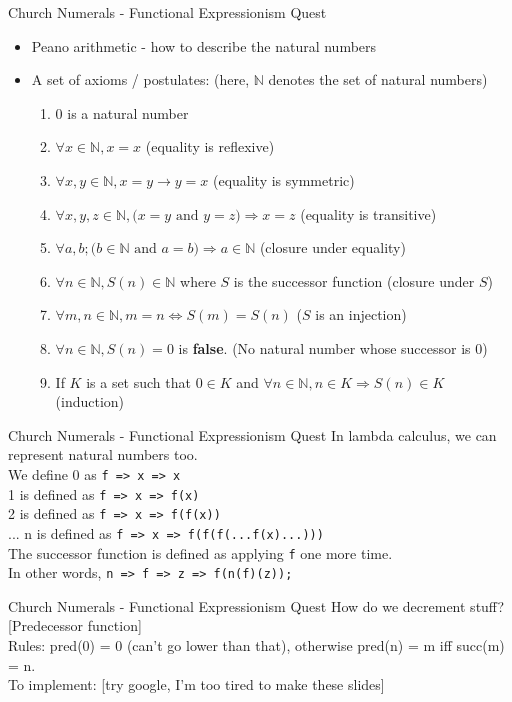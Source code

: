 \documentclass[10pt]{beamer}
\begin{document}
\begin{frame}[fragile]{Church Numerals - Functional Expressionism Quest}
\begin{itemize}
\item Peano arithmetic - how to describe the natural numbers
\item A set of axioms / postulates: (here, $\mathbb{N}$ denotes the set of natural numbers)
\begin{enumerate}
  \item 0 is a natural number
  \item $\forall x \in \mathbb{N}, x = x$ (equality is reflexive)
  \item $\forall x, y \in \mathbb{N}, x = y \rightarrow y = x$ (equality is symmetric)
  \item $\forall x, y, z \in \mathbb{N}, \Big(x=y \text{ and } y = z \Big) \Rightarrow x = z$ (equality is transitive)
  \item $\forall a, b; \Big(b \in \mathbb{N} \text{ and } a = b \Big) \Rightarrow a \in \mathbb{N}$ (closure under equality)
  \item $\forall n \in \mathbb{N}, S(n) \in \mathbb{N}$ where $S$ is the successor function (closure under $S$)
  \item $\forall m, n \in \mathbb{N}, m = n \iff S(m) = S(n)$ ($S$ is an injection)
  \item $\forall n \in \mathbb{N}, S(n) = 0$ is \textbf{false}. (No natural number whose successor is 0)
  \item If $K$ is a set such that $0 \in K$ and $\forall n \in \mathbb{N}, n \in K \Rightarrow S(n) \in K$ (induction)
\end{enumerate}
\end{itemize}
\end{frame}

\begin{frame}[fragile]{Church Numerals - Functional Expressionism Quest}
In lambda calculus, we can represent natural numbers too. \\
We define 0 as \verb|f => x => x| \\
1 is defined as \verb|f => x => f(x)| \\
2 is defined as \verb|f => x => f(f(x))| \\
... n is defined as \verb|f => x => f(f(f(...f(x)...)))| \\

The successor function is defined as applying \texttt{f} one more time. \\
In other words, \texttt{n => f => z => f(n(f)(z)); }
\end{frame}

\begin{frame}[fragile]{Church Numerals - Functional Expressionism Quest}
How do we decrement stuff? [Predecessor function] \\
Rules: pred(0) = 0 (can't go lower than that), otherwise pred(n) = m iff succ(m) = n. \\

To implement: [try google, I'm too tired to make these slides]
\end{frame}
\end{document}
